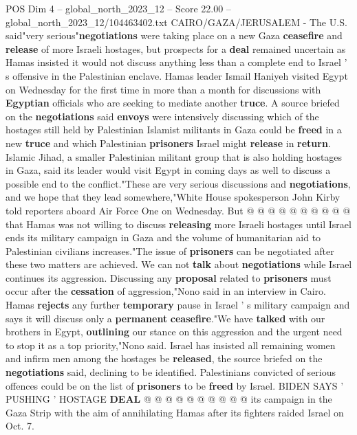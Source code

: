 \begin{textsample}{POS Dim 4 – global\_north\_2023\_12 – Score 22.00 – global\_north\_2023\_12/104463402.txt}  \label{ex:f4_pos_312}
CAIRO/GAZA/JERUSALEM - The U.S. said"very serious"\textbf{negotiations} were taking place on a new Gaza \textbf{ceasefire} and \textbf{release} of more Israeli hostages, but prospects for a \textbf{deal} remained uncertain as Hamas insisted it would not discuss anything less than a complete end to Israel ' s offensive in the Palestinian enclave.
Hamas leader Ismail Haniyeh visited Egypt on Wednesday for the first time in more than a month for discussions with \textbf{Egyptian} officials who are seeking to mediate another \textbf{truce}.
A source briefed on the \textbf{negotiations} said \textbf{envoys} were intensively discussing which of the hostages still held by Palestinian Islamist militants in Gaza could be \textbf{freed} in a new \textbf{truce} and which Palestinian \textbf{prisoners} Israel might \textbf{release} in \textbf{return}.
Islamic Jihad, a smaller Palestinian militant group that is also holding hostages in Gaza, said its leader would visit Egypt in coming days as well to discuss a possible end to the conflict."These are very serious discussions and \textbf{negotiations}, and we hope that they lead somewhere,"White House spokesperson John Kirby told reporters aboard Air Force One on Wednesday.
But @ @ @ @ @ @ @ @ @ @ that Hamas was not willing to discuss \textbf{releasing} more Israeli hostages until Israel ends its military campaign in Gaza and the volume of humanitarian aid to Palestinian civilians increases."The issue of \textbf{prisoners} can be negotiated after these two matters are achieved.
We can not \textbf{talk} about \textbf{negotiations} while Israel continues its aggression.
Discussing any \textbf{proposal} related to \textbf{prisoners} must occur after the \textbf{cessation} of aggression,"Nono said in an interview in Cairo.
Hamas \textbf{rejects} any further \textbf{temporary} pause in Israel ' s military campaign and says it will discuss only a \textbf{permanent} \textbf{ceasefire}."We have \textbf{talked} with our brothers in Egypt, \textbf{outlining} our stance on this aggression and the urgent need to stop it as a top priority,"Nono said.
Israel has insisted all remaining women and infirm men among the hostages be \textbf{released}, the source briefed on the \textbf{negotiations} said, declining to be identified.
Palestinians convicted of serious offences could be on the list of \textbf{prisoners} to be \textbf{freed} by Israel.
BIDEN SAYS ' PUSHING ' HOSTAGE \textbf{DEAL} @ @ @ @ @ @ @ @ @ @ its campaign in the Gaza Strip with the aim of annihilating Hamas after its fighters raided Israel on Oct. 7.

\end{textsample}
